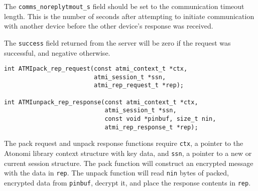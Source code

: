 The \texttt{comms_noreplytmout_s} field should be set to the communication
timeout length. This is the number of seconds after attempting to initiate
communication with another device before the other device's response was
received.

The \texttt{success} field returned from the server will be zero if the
request was successful, and negative otherwise.


\begin{lstlisting}[name=Reputation Request Packing and Response Unpacking Functions]
int ATMIpack_rep_request(const atmi_context_t *ctx,
                         atmi_session_t *ssn,
                         atmi_rep_request_t *rep);

int ATMIunpack_rep_response(const atmi_context_t *ctx,
                            atmi_session_t *ssn,
                            const void *pinbuf, size_t nin,
                            atmi_rep_response_t *rep);
\end{lstlisting}

The pack request and unpack response functions require \texttt{ctx}, a pointer
to the Atonomi library context structure with key data, and \texttt{ssn},
a pointer to a new or current session structure. The pack function will
construct an encrypted message with the data in \texttt{rep}. The unpack function
will read \texttt{nin} bytes of packed, encrypted data from \texttt{pinbuf},
decrypt it, and place the response contents in \texttt{rep}.

